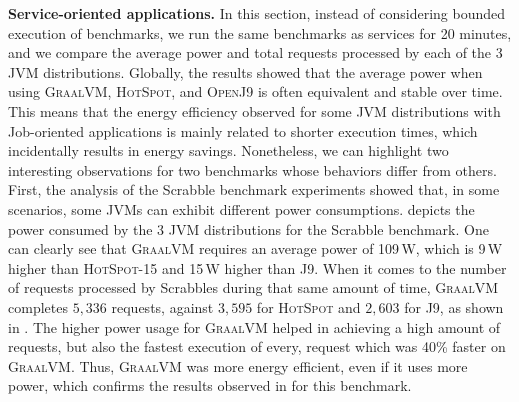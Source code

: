 \vspace{6pt}
\noindent\textbf{Service-oriented applications.}
In this section, instead of considering bounded execution of benchmarks, we run the same benchmarks as services for 20 minutes, and we compare the average power and total requests processed by each of the 3 JVM distributions.
Globally, the results showed that the average power when using \textsc{GraalVM}, \textsc{HotSpot}, and \textsc{OpenJ9} is often equivalent and stable over time.
This means that the energy efficiency observed for some JVM distributions with Job-oriented applications is mainly related to shorter execution times, which incidentally results in energy savings.
Nonetheless, we can highlight two interesting observations for two benchmarks whose behaviors differ from others.
First, the analysis of the \textsf{Scrabble} benchmark experiments showed that, in some scenarios, some JVMs can exhibit different power consumptions.
 depicts the power consumed by the 3 JVM distributions for the \textsf{Scrabble} benchmark.
One can clearly see that \textsc{GraalVM} requires an average power of 109\,W, which is 9\,W higher than \textsc{HotSpot-15} and 15\,W higher than \textsc{J9}.
When it comes to the number of requests processed by \textsf{Scrabbles} during that same amount of time, \textsc{GraalVM} completes $5,336$ requests, against $3,595$ for \textsc{HotSpot} and $2,603$ for \textsc{J9}, as shown in .
The higher power usage for \textsc{GraalVM} helped in achieving a high amount of requests, but also the fastest execution of every, request which was 40\% faster on \textsc{GraalVM}.
Thus, \textsc{GraalVM} was more energy efficient, even if it uses more power, which confirms the results observed in  for this benchmark.

